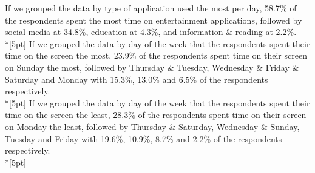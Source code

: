 If we grouped the data by type of application used the most per day, 58.7\% of the respondents spent the most time on entertainment applications, followed by social media at 34.8\%, education at 4.3\%, and information \& reading at 2.2\%. \\*[5pt]
If we grouped the data by day of the week that the respondents spent their time on the screen the most, 23.9\% of the respondents spent time on their screen on Sunday the most, followed by Thursday \& Tuesday, Wednesday \& Friday \& Saturday and Monday with 15.3\%, 13.0\% and 6.5\% of the respondents respectively.\\*[5pt]
If we grouped the data by day of the week that the respondents spent their time on the screen the least, 28.3\% of the respondents spent time on their screen on Monday the least, followed by Thursday \& Saturday, Wednesday \& Sunday, Tuesday and Friday with 19.6\%, 10.9\%, 8.7\% and 2.2\% of the respondents respectively.\\*[5pt]